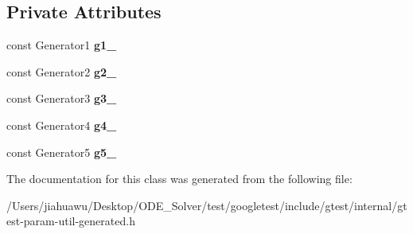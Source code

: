 \subsection*{Private Attributes}
\begin{DoxyCompactItemize}
\item 
\mbox{\label{classtesting_1_1internal_1_1_cartesian_product_holder5_a81bf8ba58a8f701efade5c1d18bc9dfa}} 
const Generator1 {\bfseries g1\+\_\+}
\item 
\mbox{\label{classtesting_1_1internal_1_1_cartesian_product_holder5_a57165b6e989e926177914113b9f98b06}} 
const Generator2 {\bfseries g2\+\_\+}
\item 
\mbox{\label{classtesting_1_1internal_1_1_cartesian_product_holder5_ae65dc0fd8fec8fbb393fe8ad978b825c}} 
const Generator3 {\bfseries g3\+\_\+}
\item 
\mbox{\label{classtesting_1_1internal_1_1_cartesian_product_holder5_a290ba6ef45af1b5e026aa298ac680ff1}} 
const Generator4 {\bfseries g4\+\_\+}
\item 
\mbox{\label{classtesting_1_1internal_1_1_cartesian_product_holder5_abff8a65f6a0fb6d5f1d8d9d5c3472b72}} 
const Generator5 {\bfseries g5\+\_\+}
\end{DoxyCompactItemize}


The documentation for this class was generated from the following file\+:\begin{DoxyCompactItemize}
\item 
/\+Users/jiahuawu/\+Desktop/\+O\+D\+E\+\_\+\+Solver/test/googletest/include/gtest/internal/gtest-\/param-\/util-\/generated.\+h\end{DoxyCompactItemize}
